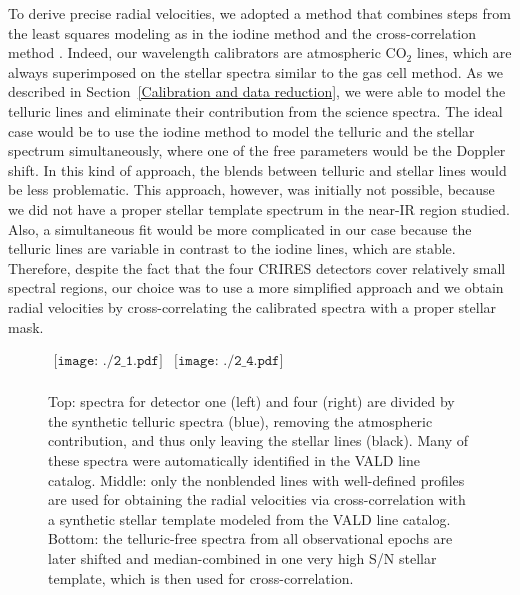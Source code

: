 \documentclass{aa}
\begin{document}
To derive precise radial velocities, we adopted a method that combines steps from the 
least squares modeling as in the iodine method \citep{Butler} and the cross-correlation method \citep{Baranne}. 
Indeed, our wavelength calibrators are atmospheric CO$_2$
lines, which are always superimposed on the stellar spectra similar to the gas cell method. 
As we described in Section~\ref{Calibration and data reduction}, we were able to model the 
telluric lines and eliminate their contribution from the science spectra.
The ideal case would be to use the iodine method to model  the 
telluric and the stellar spectrum simultaneously, where one of the free parameters would be the Doppler shift.
In this kind of approach, the blends between telluric and stellar lines would be less problematic.
This approach, however, was initially not possible, because we did not have a proper 
stellar template spectrum in the near-IR region studied. 
Also, a simultaneous fit would be more complicated in our case because the telluric lines are variable
in contrast to the iodine lines, which are stable. 
Therefore, despite the fact that the four CRIRES detectors cover relatively small spectral regions, our
choice was to use a more simplified approach and we obtain radial velocities by cross-correlating 
the calibrated spectra with a proper stellar mask.
 

\begin{figure*}[htp!]
\begin{center}$
\begin{array}{cc}
\texttt{[image: ./2\_1.pdf]} &
\texttt{[image: ./2\_4.pdf]}\\
\end{array}$
 
\end{center}
\caption{Top: spectra for detector one (left) and four (right) are divided by the synthetic telluric spectra (blue), removing the 
atmospheric contribution, and thus only leaving  the stellar lines (black). 
Many of these spectra were automatically identified in the VALD line catalog.
Middle: only the nonblended lines with well-defined profiles are used for obtaining the radial velocities 
via cross-correlation with a synthetic stellar template modeled from the VALD line catalog. 
Bottom: the telluric-free spectra from all observational epochs are later shifted and median-combined 
in one very high S/N stellar template, which is then used for cross-correlation.
} 
 
\label{FigGam:chip1-4c-cascade}  
\end{figure*}
\end{document}
